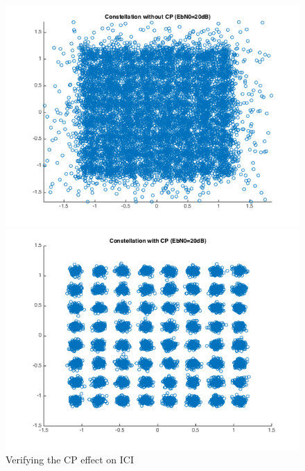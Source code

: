 \documentclass[a4paper]{article}
\begin{document}
    \begin{figure}[hbtp]
		\begin{minipage}[t]{0.5\linewidth}
			\centering
			\includegraphics[scale=0.5]{figures/const_nocp.png}
			\vspace{-0.5cm}
			\centering
		\end{minipage}
		\begin{minipage}[t]{0.5\linewidth}
			\centering
			\includegraphics[scale=0.5]{figures/const_cp.png}
			\vspace{-0.5cm}
			\centering
		\end{minipage}
		\caption{Verifying the CP effect on ICI}
		\label{fig:cpICI}
	\end{figure}
    
\end{document}
